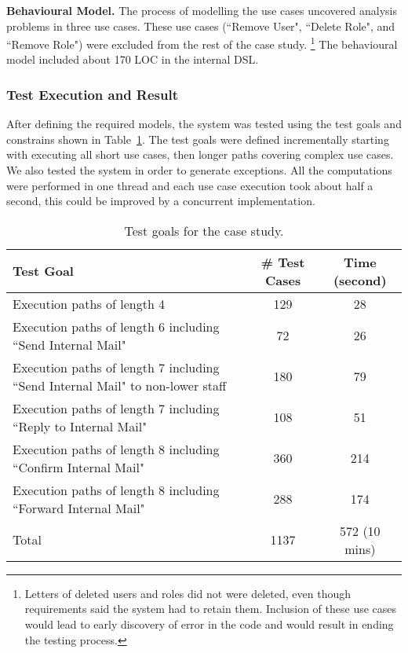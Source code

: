\textbf{Behavioural Model.} \label{sec:case-study-behaviour} The process of modelling the use cases uncovered analysis problems in three use cases. These use cases (``Remove User", ``Delete Role", and ``Remove Role") were excluded from the rest of the case study.
\footnote{Letters of deleted users and roles did not were deleted, even though requirements said the system had to retain them.
Inclusion of these use cases would lead to early discovery of error in the code and would result in ending the testing process.}
The behavioural model included about 170 LOC in the internal DSL.  

\subsubsection{Test Execution and Result}
\label{sec:case-study-result}
After defining the required models, the system was tested using the test goals and constrains shown in Table~\ref{tbl:case-study-goals}. The test goals were defined incrementally starting with executing all short use cases, then longer paths covering complex use cases. We also tested the system in order to generate exceptions. All the computations were performed in one thread and each use case execution took about half a second, this could be improved by a concurrent implementation.

\begin{table}[!t]
\caption{Test goals for the case study.}
\label{tbl:case-study-goals}
\centering
\begin{tabular}{|p{4cm}|c|c|}
\hline
Test Goal & \# Test Cases & Time (second)  \\ \hline
Execution paths of length 4 & 129 & 28 \\  \hline
Execution paths of length 6 including ``Send Internal Mail" & 72 & 26 \\ \hline
Execution paths of length 7 including ``Send Internal Mail" to non-lower staff & 180 & 79 \\ \hline
Execution paths of length 7 including ``Reply to Internal Mail" & 108 & 51 \\ \hline
Execution paths of length 8 including ``Confirm Internal Mail" & 360 & 214 \\ \hline
Execution paths of length 8 including ``Forward Internal Mail" & 288 & 174 \\ \hline\hline
Total & 1137 & 572 (10 mins) \\
\hline
\end{tabular}
\end{table}

